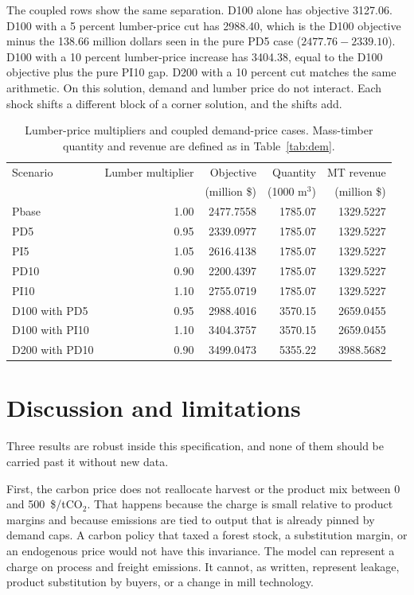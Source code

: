 \documentclass[11pt]{article}
\begin{document}
The coupled rows show the same separation. D100 alone has objective 3127.06. D100 with a 5 percent lumber-price cut has 2988.40, which is the D100 objective minus the 138.66 million dollars seen in the pure PD5 case ($2477.76 - 2339.10$). D100 with a 10 percent lumber-price increase has 3404.38, equal to the D100 objective plus the pure PI10 gap. D200 with a 10 percent cut matches the same arithmetic. On this solution, demand and lumber price do not interact. Each shock shifts a different block of a corner solution, and the shifts add.

\begin{table}[ht]
\centering
\caption{Lumber-price multipliers and coupled demand-price cases. Mass-timber quantity and revenue are defined as in Table~\ref{tab:dem}.}
\label{tab:price}
\begin{tabular}{lrrrr}
\toprule
Scenario & Lumber multiplier & Objective & Quantity & MT revenue \\
 & & (million \$) & (1000 m$^3$) & (million \$) \\
\midrule
Pbase & 1.00 & 2477.7558 & 1785.07 & 1329.5227 \\
PD5 & 0.95 & 2339.0977 & 1785.07 & 1329.5227 \\
PI5 & 1.05 & 2616.4138 & 1785.07 & 1329.5227 \\
PD10 & 0.90 & 2200.4397 & 1785.07 & 1329.5227 \\
PI10 & 1.10 & 2755.0719 & 1785.07 & 1329.5227 \\
\midrule
D100 with PD5 & 0.95 & 2988.4016 & 3570.15 & 2659.0455 \\
D100 with PI10 & 1.10 & 3404.3757 & 3570.15 & 2659.0455 \\
D200 with PD10 & 0.90 & 3499.0473 & 5355.22 & 3988.5682 \\
\bottomrule
\end{tabular}
\end{table}

\section{Discussion and limitations}
\label{sec:limits}

Three results are robust inside this specification, and none of them should be carried past it without new data.

First, the carbon price does not reallocate harvest or the product mix between 0 and 500~\$/tCO$_2$. That happens because the charge is small relative to product margins and because emissions are tied to output that is already pinned by demand caps. A carbon policy that taxed a forest stock, a substitution margin, or an endogenous price would not have this invariance. The model can represent a charge on process and freight emissions. It cannot, as written, represent leakage, product substitution by buyers, or a change in mill technology.
\end{document}
